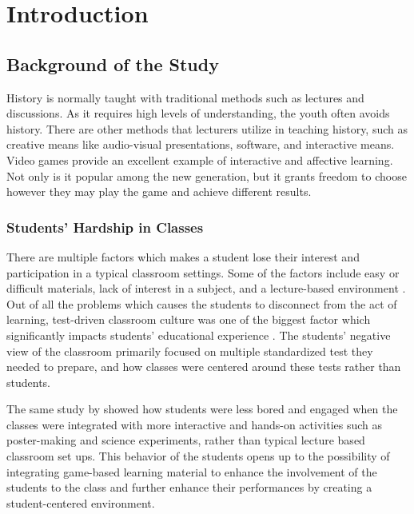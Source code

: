 %
%
%                 

\chapter{Introduction}
\label{sec:intro}   
\section{Background of the Study}
\label{sec:overview}

History is normally taught with traditional methods such as lectures and discussions. As it requires high levels of understanding, the youth often avoids history. There are other methods that lecturers utilize in teaching history, such as creative means like audio-visual presentations, software, and interactive means. Video games provide an excellent example of interactive and affective learning. Not only is it popular among the new generation, but it grants freedom to choose however they may play the game and achieve different results.
 
\subsection{Students' Hardship in Classes}
There are multiple factors which makes a student lose their interest and participation in a typical classroom settings. Some of the factors include easy or difficult materials, lack of interest in a subject, and a lecture-based environment \cite{medium:mosley}. Out of all the problems which causes the students to disconnect from the act of learning, test-driven classroom culture was one of the biggest factor which significantly impacts students' educational experience \cite{mora}. The students’ negative view of the classroom primarily focused on multiple standardized test they needed to prepare, and how classes were centered around these tests rather than students.

The same study by \cite{mora} showed how students were less bored and engaged when the classes were integrated with more interactive and hands-on activities such as poster-making and science experiments, rather than typical lecture based classroom set ups. This behavior of the students opens up to the possibility of integrating game-based learning material to enhance the involvement of the students to the class and further enhance their performances by creating a student-centered environment.


